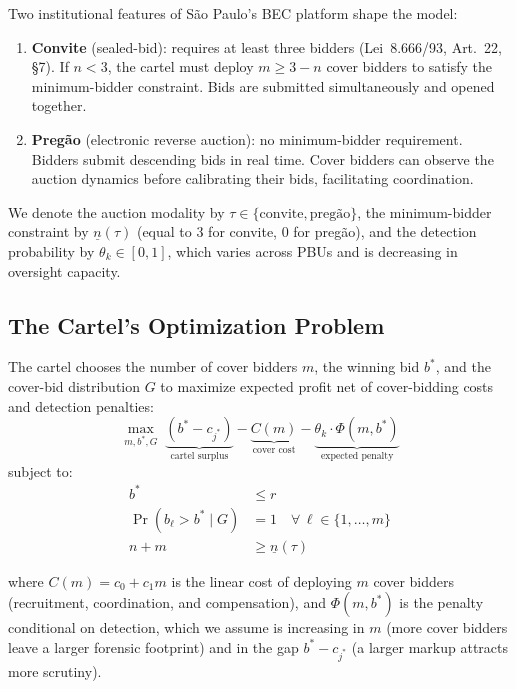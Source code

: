 Two institutional features of S\~ao Paulo's BEC platform shape the
model:

\begin{enumerate}
  \item \textbf{Convite} (sealed-bid): requires at least three bidders
    (Lei~8.666/93, Art.~22, \S7). If $n < 3$, the cartel must deploy
    $m \geq 3 - n$ cover bidders to satisfy the minimum-bidder
    constraint. Bids are submitted simultaneously and opened together.
  \item \textbf{Preg\~ao} (electronic reverse auction): no
    minimum-bidder requirement. Bidders submit descending bids in real
    time. Cover bidders can observe the auction dynamics before
    calibrating their bids, facilitating coordination.
\end{enumerate}

\noindent We denote the auction modality by $\tau \in \{\text{convite},
\text{preg\~ao}\}$, the minimum-bidder constraint by $\underline{n}(\tau)$
(equal to 3 for convite, 0 for preg\~ao), and the detection probability
by $\theta_k \in [0,1]$, which varies across PBUs and is decreasing in
oversight capacity.


\subsection{The Cartel's Optimization Problem}
\label{sec:cartel_problem}

The cartel chooses the number of cover bidders $m$, the winning bid
$b^*$, and the cover-bid distribution $G$ to maximize expected profit
net of cover-bidding costs and detection penalties:
\begin{equation}
  \max_{m, b^*, G} \; \underbrace{(b^* - c_{j^*})}_{\text{cartel surplus}}
  - \underbrace{C(m)}_{\text{cover cost}}
  - \underbrace{\theta_k \cdot \Phi(m, b^*)}_{\text{expected penalty}}
  \label{eq:cartel_objective}
\end{equation}
subject to:
\begin{align}
  b^* &\leq r \label{eq:ref_price_constraint} \\
  \Pr(b_\ell > b^* \mid G) &= 1 \quad \forall \, \ell \in \{1, \ldots, m\}
    \label{eq:cover_above} \\
  n + m &\geq \underline{n}(\tau) \label{eq:min_bidder}
\end{align}

\noindent where $C(m) = c_0 + c_1 m$ is the linear cost of deploying $m$
cover bidders (recruitment, coordination, and compensation), and
$\Phi(m, b^*)$ is the penalty conditional on detection, which we assume
is increasing in $m$ (more cover bidders leave a larger forensic
footprint) and in the gap $b^* - c_{j^*}$ (a larger markup attracts
more scrutiny).

